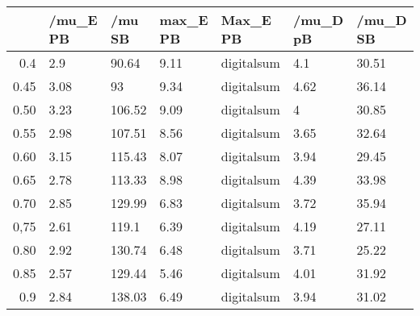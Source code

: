 \begin{table}[ht]
\centering
\begin{tabular}{rllllll}
  \hline
 & /mu\_E PB & /mu SB & max\_E PB & Max\_E PB & /mu\_D pB & /mu\_D SB \\ 
  \hline
0.4 & 2.9 & 90.64 & 9.11 & digitalsum & 4.1 & 30.51 \\ 
  0.45 & 3.08 & 93 & 9.34 & digitalsum & 4.62 & 36.14 \\ 
  0.50 & 3.23 & 106.52 & 9.09 & digitalsum & 4 & 30.85 \\ 
  0.55 & 2.98 & 107.51 & 8.56 & digitalsum & 3.65 & 32.64 \\ 
  0.60 & 3.15 & 115.43 & 8.07 & digitalsum & 3.94 & 29.45 \\ 
  0.65 & 2.78 & 113.33 & 8.98 & digitalsum & 4.39 & 33.98 \\ 
  0.70 & 2.85 & 129.99 & 6.83 & digitalsum & 3.72 & 35.94 \\ 
  0,75 & 2.61 & 119.1 & 6.39 & digitalsum & 4.19 & 27.11 \\ 
  0.80 & 2.92 & 130.74 & 6.48 & digitalsum & 3.71 & 25.22 \\ 
  0.85 & 2.57 & 129.44 & 5.46 & digitalsum & 4.01 & 31.92 \\ 
  0.9 & 2.84 & 138.03 & 6.49 & digitalsum & 3.94 & 31.02 \\ 
   \hline
\end{tabular}
\end{table}
